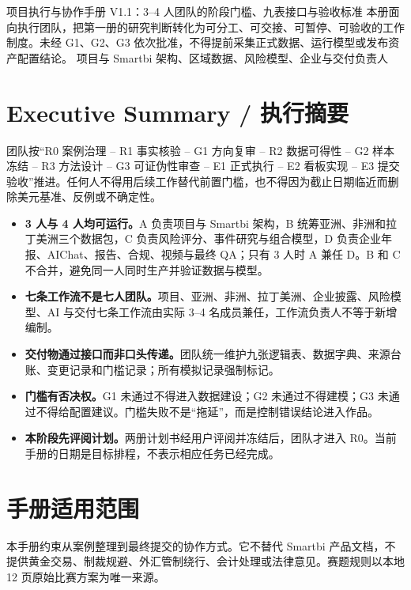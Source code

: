 \documentclass[UTF8,12pt,openany]{ctexbook}
\begin{document}
\PlanTitlePage
  {项目执行与协作手册}
  {V1.1：3--4 人团队的阶段门槛、九表接口与验收标准}
  {本册面向执行团队，把第一册的研究判断转化为可分工、可交接、可暂停、可验收的工作制度。未经 G1、G2、G3 依次批准，不得提前采集正式数据、运行模型或发布资产配置结论。}
  {项目与 Smartbi 架构、区域数据、风险模型、企业与交付负责人}

\frontmatter
\chapter*{Executive Summary / 执行摘要}

\begin{decisionbox}[执行总则]
团队按“R0 案例治理 -- R1 事实核验 -- G1 方向复审 -- R2 数据可得性 -- G2 样本冻结 -- R3 方法设计 -- G3 可证伪性审查 -- E1 正式执行 -- E2 看板实现 -- E3 提交验收”推进。任何人不得用后续工作替代前置门槛，也不得因为截止日期临近而删除美元基准、反例或不确定性。
\end{decisionbox}

\begin{itemize}
  \item \textbf{3 人与 4 人均可运行。}A 负责项目与 Smartbi 架构，B 统筹亚洲、非洲和拉丁美洲三个数据包，C 负责风险评分、事件研究与组合模型，D 负责企业年报、AIChat、报告、合规、视频与最终 QA；只有 3 人时 A 兼任 D。B 和 C 不合并，避免同一人同时生产并验证数据与模型。
  \item \textbf{七条工作流不是七人团队。}项目、亚洲、非洲、拉丁美洲、企业披露、风险模型、AI 与交付七条工作流由实际 3--4 名成员兼任，工作流负责人不等于新增编制。
  \item \textbf{交付物通过接口而非口头传递。}团队统一维护九张逻辑表、数据字典、来源台账、变更记录和门槛记录；所有模拟记录强制标记。
  \item \textbf{门槛有否决权。}G1 未通过不得进入数据建设；G2 未通过不得建模；G3 未通过不得给配置建议。门槛失败不是“拖延”，而是控制错误结论进入作品。
  \item \textbf{本阶段先评阅计划。}两册计划书经用户评阅并冻结后，团队才进入 R0。当前手册的日期是目标排程，不表示相应任务已经完成。
\end{itemize}

\chapter*{手册适用范围}
本手册约束从案例整理到最终提交的协作方式。它不替代 Smartbi 产品文档，不提供黄金交易、制裁规避、外汇管制绕行、会计处理或法律意见。赛题规则以本地 12 页原始比赛方案为唯一来源\autocite{competition2026}。
\end{document}
